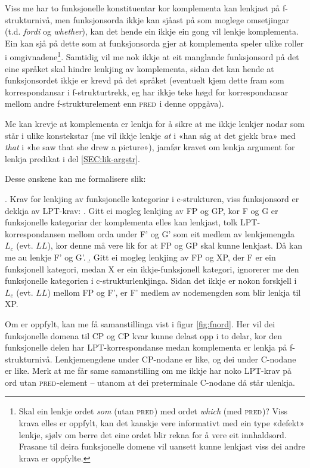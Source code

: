 \documentclass[12pt,a4paper,oneside,draft]{report}
\newcommand{\F}[2]{\textsc{#1}\ensuremath{_{#2}}}
\newcommand{\PRED}{\F{pred}{}}
\begin{document}
Viss me har to funksjonelle konstituentar kor komplementa kan lenkjast
 på f-strukturnivå, men funksjonsorda ikkje kan sjåast på som moglege
 omsetjingar (t.d. \emph{fordi} og \emph{whether}), kan det hende ein ikkje ein
 gong vil lenkje komplementa. Ein kan sjå på dette som at
 funksjonsorda gjer at komplementa speler ulike roller i
 omgivnadene\footnote{Skal ein lenkje ordet \emph{som} (utan \PRED{}) med ordet \emph{which} (med
        \PRED{})? Viss krava elles er oppfylt, kan det kanskje vere
        informativt med ein type «defekt» lenkje, sjølv om berre det
        eine ordet blir rekna for å vere eit innhaldsord. Frasane til
        deira funksjonelle domene vil uansett kunne lenkjast viss dei andre
        krava er oppfylte. }. Samtidig vil me nok ikkje at eit manglande
 funksjonsord på det eine språket skal hindre lenkjing av komplementa,
 sidan det kan hende at funksjonsordet ikkje er krevd på det språket
 (eventuelt kjem dette fram som korrespondansar i f-strukturtrekk, eg
 har ikkje teke høgd for korrespondansar mellom andre
 f-strukturelement enn \PRED{} i denne oppgåva).

Me kan krevje at komplementa er lenkja for å sikre at me ikkje lenkjer
 nodar som står i ulike konstekstar (me vil ikkje lenkje \emph{at} i «han
 såg at det gjekk bra» med \emph{that} i «he saw that she drew a picture»),
 jamfør kravet om lenkja argument for lenkja predikat i del
 \ref{SEC:lik-argstr}.

Desse ønskene kan me formalisere slik:

\ex. \label{fnordkrav} Krav for lenkjing av funksjonelle kategoriar i
    c-strukturen, viss funksjonsord er dekkja av LPT-krav:
\a. Gitt ei mogleg lenkjing av FP og GP, kor F og G er funksjonelle
    kategoriar der komplementa elles kan lenkjast,
    tolk LPT-korrespondansen mellom orda under F' og G' som eit
    medlem av lenkjemengda $L_c$ (evt. $LL$), kor denne må vere lik
    for at FP og GP skal kunne lenkjast. Då kan me au lenkje F' og G'.
\b. Gitt ei mogleg lenkjing av FP og XP, der F er ein funksjonell
    kategori, medan X er ein ikkje-funksjonell kategori, ignorerer me
    den funksjonelle kategorien i c-strukturlenkjinga. Sidan det ikkje
    er nokon forskjell i $L_c$ (evt. $LL$) mellom FP og F', er F' medlem
    av nodemengden som blir lenkja til XP.

Om \Last[a] er oppfylt, kan me få samanstillinga vist i figur
 \ref{fig:fnord}. Her vil dei funksjonelle domena til CP og CP kvar
 kunne delast opp i to delar, kor den funksjonelle delen har
 LPT-korrespondanse medan komplementa er lenkja på
 f-strukturnivå. Lenkjemengdene under CP-nodane er like, og dei under
 C-nodane er like. Merk at me får same samanstilling om me ikkje har
 noko LPT-krav på ord utan \PRED{}-element -- utanom at dei
 preterminale C-nodane då står ulenkja.
\end{document}
